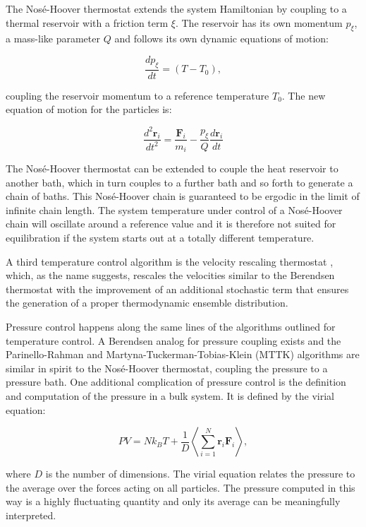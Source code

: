 \documentclass[english, a4paper, 12pt, titlepage, draft]{article}
\newcommand{\vect}[1]{\mathbf{#1}}
\begin{document}
The Nos\'e-Hoover thermostat \cite{Nose, Hoover} extends the system Hamiltonian by coupling to a thermal reservoir with a friction term $\xi$.
The reservoir has its own momentum $p_{\xi}$, a mass-like parameter $Q$ and follows its own dynamic equations of motion:

\begin{equation}
    \frac{dp_{\xi}}{dt} = (T-T_0),
\end{equation}

\noindent
coupling the reservoir momentum to a reference temperature $T_0$.
The new equation of motion for the particles is:

\begin{equation}
    \frac{d^2\vect{r}_i}{dt^2} = \frac{\vect{F}_i}{m_i} - \frac{p_{\xi}}{Q} \frac{d\vect{r}_i}{dt}
\end{equation}

\noindent
The Nos\'e-Hoover thermostat can be extended to couple the heat reservoir to another bath, which in turn couples to a further bath and so forth to generate a chain of baths.
This Nos\'e-Hoover chain is guaranteed to be ergodic in the limit of infinite chain length.
The system temperature under control of a Nos\'e-Hoover chain will oscillate around a reference value and it is therefore not suited for equilibration if the system starts out at a totally different temperature.

A third temperature control algorithm is the velocity rescaling thermostat \cite{Vrescale}, which, as the name suggests, rescales the velocities similar to the Berendsen thermostat with the improvement of an additional stochastic term that ensures the generation of a proper thermodynamic ensemble distribution.

Pressure control happens along the same lines of the algorithms outlined for temperature control.
A Berendsen analog for pressure coupling exists and the Parinello-Rahman \cite{ParrinelloRahman} and Martyna-Tuckerman-Tobias-Klein (MTTK) \cite{MTTK} algorithms are similar in spirit to the Nos\'e-Hoover thermostat, coupling the pressure to a pressure bath.
One additional complication of pressure control is the definition and computation of the pressure in a bulk system.
It is defined by the virial equation:

\begin{equation}
    PV = Nk_BT + \frac{1}{D} \left< \sum^N_{i=1}\vect{r}_i \vect{F}_i \right>,
\end{equation}

\noindent
where $D$ is the number of dimensions.
The virial equation relates the pressure to the average over the forces acting on all particles.
The pressure computed in this way is a highly fluctuating quantity and only its average can be meaningfully interpreted.
\end{document}
